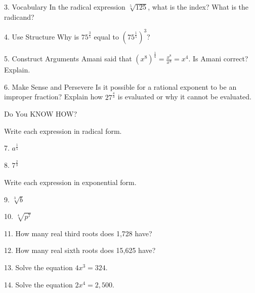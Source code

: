\documentclass{article}
\newenvironment{concept-summary}{}{}    %
\newcommand{\answer}[1]{}               %
\newcommand{\uncertain}[2]{#1}          %
\begin{document}
\begin{concept-summary}
3. Vocabulary In the radical expression \(\sqrt[5]{125}\), what is the index? What is the radicand?

\answer{The index is 5 and the radicand is 125.}

4. Use Structure Why is \(75^{\frac35}\) equal to \(\left(75^{\frac15}\right)^3\)?

\answer{\(\left(75^{\frac15}\right)^3\) can be simplified using the Power of a Power Property. Multiplying the exponents gives \(75^{\frac35}\).}

5. Construct Arguments Amani said that \((x^8)^{\frac14}=\frac{x^8}{x^4}=x^4\). Is Amani correct? Explain.

\answer{No; Amani did not apply the Power of a Power Property correctly; \((x^8)^{\frac14}=x^{8\cdot \frac14}=x^2\).}

6. Make Sense and Persevere Is it possible for a rational exponent to be an improper fraction? Explain how \(27^{\frac43}\) is evaluated or why it cannot be evaluated.

\answer{Yes, a rational exponent may be an improper fraction; \(27^{\frac43}\) is evaluated by finding the cube root of 27, which is 3, and raising it to the fourth power, which is 81.}

Do You KNOW HOW?

Write each expression in radical form.

7. \(a^{\frac15}\)

\answer{\(\sqrt[5]{a}\)}

8. \(7^{\frac23}\)

\answer{\(\sqrt[3]{7^2}\)}

Write each expression in exponential form.

9. \(\sqrt[3]{b}\)

\answer{\(b^{\frac13}\)}

10. \(\sqrt[4]{p^7}\)

\answer{\(p^{\frac74}\)}

11. How many real third roots does 1,728 have?

\answer{one}

12. How many real sixth roots does 15,625 have?

\answer{two}

13. Solve the equation \(4x^3=324\).

\answer{\(x\approx4.33\)}

14. Solve the equation \(2x^4=2,500\).

\answer{\uncertain{\(x\approx5.95\)}{\(x\approx\pm5.95\)}}


\end{concept-summary}
\end{document}
